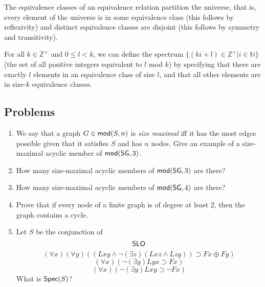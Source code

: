 \begin{mdframed}[linewidth=1]
The equivalence classes of an equivalence relation partition the universe, that is, every element of the universe is in some equivalence class (this follows by reflexivity) and distinct equivalence classes are disjoint (this follows by symmetry and transitivity). 

For all $k\in \mathbb{Z}^+$ and $0\leq l<k$, we can define the spectrum $\{(ki + l)\in \mathbb{Z}^+| i \in \mathbb{N}\}$ (the set of all positive integers equivalent to $l$ mod $k$) by specifying that there are exactly $l$ elements in an equivalence class of size $l$, and that all other elements are in size-$k$ equivalence classes. 


\end{mdframed}



\newpage
\begin{mdframed}[linewidth=1]
\section*{Problems}
\begin{enumerate}
    \item We say that a graph $G \in \mbox{$\mathsf{mod}(S,n)$}$ is \emph{size maximal} iff it has the most edges possible given that it satisfies $S$ and has $n$ nodes. Give an example of a size-maximal acyclic member of $\mbox{$\mathsf{mod}(\mbox{$\mathsf{SG}$},3)$}$. 

    \item How many size-maximal acyclic members of $\mbox{$\mathsf{mod}(\mbox{$\mathsf{SG}$},3)$}$ are there?

    \item How many size-maximal acyclic members of $\mbox{$\mathsf{mod}(\mbox{$\mathsf{SG}$},4)$}$ are there?

    \item Prove that if every node of a finite graph is of degree at least 2, then the graph contains a cycle. 
\iffalse
\item How many size-maximal members of $\modn{\sg}{6}$ have no 3-cycles? 

    \item Prove the \textbf{Handshake Lemma}: For every graph $G=(V,E)$, $\sum_{v \in V}\deg{v} = 2|E|$. 

    \item Prove that in any graph the number of vertices of odd degree is even.
\fi

    \item Let $S$ be the conjunction of 
   \[
       \mbox{$\mathsf{SLO}$}
   \]
   \[
       (\forall x)(\forall y)((Lxy \land \lnot (\exists z)(Lxz \land Lzy)) \supset Fx \oplus Fy)
   \]
   \[
       (\forall x)(\lnot (\exists y)Lyx\supset Fx)
   \]
   \[
       (\forall x)(\lnot (\exists y)Lxy\supset \lnot Fx)
   \]
   What is $\mbox{$\mathsf{Spec}(S)$}$?


\end{enumerate}
\end{mdframed}
